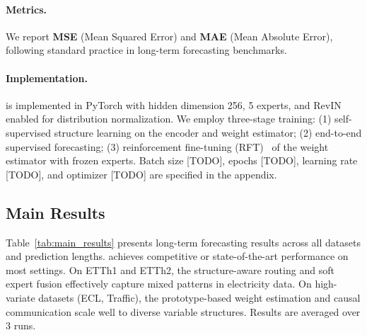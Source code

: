 \paragraph{Metrics.}
We report \textbf{MSE} (Mean Squared Error) and \textbf{MAE} (Mean Absolute Error), following standard practice in long-term forecasting benchmarks.

\paragraph{Implementation.}
\model is implemented in PyTorch with hidden dimension 256, 5 experts, and RevIN~\cite{kim2022reversible} enabled for distribution normalization. We employ three-stage training: (1) self-supervised structure learning on the encoder and weight estimator; (2) end-to-end supervised forecasting; (3) reinforcement fine-tuning (RFT)~\cite{schulman2017ppo} of the weight estimator with frozen experts. Batch size [TODO], epochs [TODO], learning rate [TODO], and optimizer [TODO] are specified in the appendix.

\subsection{Main Results}

Table~\ref{tab:main_results} presents long-term forecasting results across all datasets and prediction lengths. \model achieves competitive or state-of-the-art performance on most settings. On ETTh1 and ETTh2, the structure-aware routing and soft expert fusion effectively capture mixed patterns in electricity data. On high-variate datasets (ECL, Traffic), the prototype-based weight estimation and causal communication scale well to diverse variable structures. Results are averaged over 3 runs.

